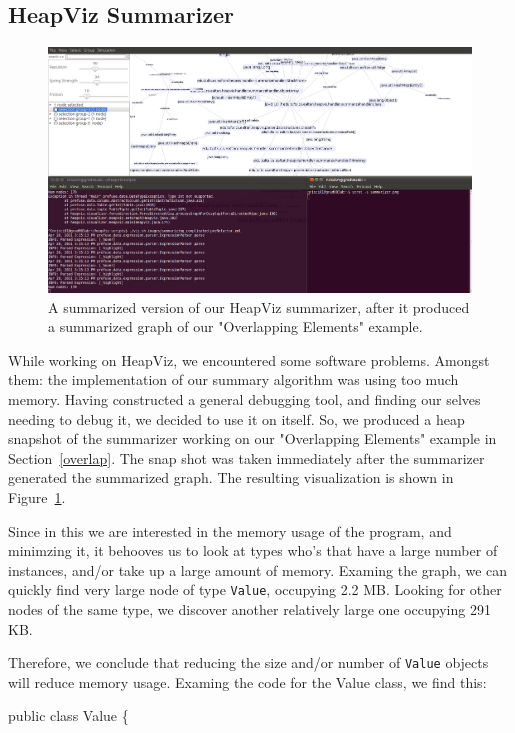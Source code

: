 \subsection{HeapViz Summarizer}

\begin{figure}[t]
  \includegraphics[width=\columnwidth]{figs/summarizer}
  \caption{A summarized version of our HeapViz summarizer, after it produced
	   a summarized graph of our "Overlapping Elements" example.}
  \label{fig:summarizer}
\end{figure}


While working on HeapViz, we encountered some software problems. Amongst them: the
implementation of our summary algorithm was using too much memory. Having 
constructed a general debugging tool, and finding our selves needing to debug it,
we decided to use it on itself. So, we produced a heap snapshot of the 
summarizer working on our "Overlapping Elements" example in Section~\ref{overlap}.
The snap shot was
taken immediately after the summarizer generated the summarized graph. The
resulting visualization is shown in Figure~\ref{fig:summarizer}.

Since in this we are interested in the memory usage of the program, 
and minimzing it, it behooves us to look at types who's that have a large 
number of instances, and/or take up a large amount of memory. Examing the graph,
we can quickly find very large node of type \texttt{Value}, occupying 2.2 MB. Looking for other nodes of the same type, we discover another relatively
large one occupying 291 KB. 

Therefore, we conclude that reducing the size and/or number of \texttt{Value} objects will reduce memory usage. Examing the code for the Value class, we find this:

public class Value \{

